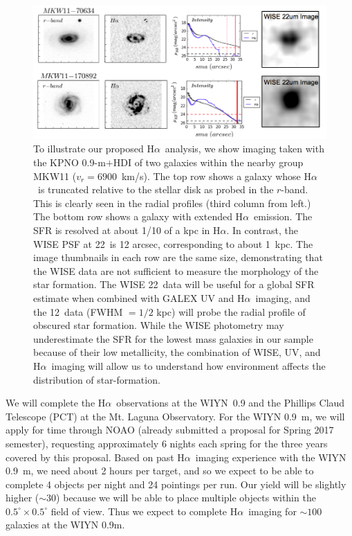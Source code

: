 \documentclass[11pt, preprint]{aastex}
\newcommand{\ha}{H$\alpha$}
\begin{document}
\begin{figure}[h]
\centering
\includegraphics[width=.85\textwidth]{HalphaProfileWISE.png}
\vspace{-0.3cm}
\caption{\small
To illustrate our proposed \ha \  analysis, we show
imaging taken with the KPNO 0.9-m$+$HDI of two galaxies within the
nearby group  MKW11 ($v_r = 6900$~km/s). The top row shows a
galaxy whose \ha \ is truncated
relative to the stellar disk as
probed in the $r$-band. This is clearly seen in the radial profiles (third column from left.)  The bottom row shows a galaxy with extended
\ha \ emission.  The SFR is resolved  at about 1/10 of a kpc in \ha. In
contrast, the WISE PSF at 22\micron\ is 12 arcsec, corresponding to about 1~kpc. The image thumbnails in each row are the same size, demonstrating
that the WISE data are not sufficient to measure the 
morphology of the star formation.  The WISE 22\micron\ data will be useful for a global SFR estimate when combined with GALEX UV and \ha\ imaging, and the 12\micron\ data (FWHM $=1/2$ kpc) will probe the radial profile of obscured star formation.  While the WISE photometry may
underestimate the SFR for  the lowest mass galaxies in our sample
because of their low metallicity, the combination of WISE, UV, and \ha\ imaging will allow us to understand how environment affects the distribution of star-formation.
}
\label{fig3}
\end{figure}


We will complete the \ha \ observations at the WIYN~0.9 and the Phillips Claud Telescope (PCT) at the Mt. Laguna Observatory.  For the WIYN 0.9~m, we will apply for time through NOAO (already submitted a proposal for Spring 2017 semester), requesting
approximately 6 nights each spring for the three years covered by this
proposal.  Based on past \ha \ imaging experience with the WIYN 0.9~m,
we need about 2 hours per target, and so we expect to be able to
complete 4 objects per night and 24 pointings per run.  Our yield will 
be slightly higher ($\sim 30$) because we will be able to place multiple objects within
the $0.5^\circ \times 0.5^\circ$ field of view.  Thus we expect to
complete \ha \ imaging for
$\sim 100$ galaxies at the WIYN 0.9m. 
\end{document}
